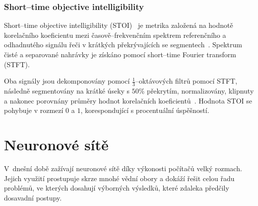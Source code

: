 



\subsection{Short--time objective intelligibility}
Short--time objective intelligibility (STOI)~\cite{taal-stoi} je metrika založená na hodnotě korelačního koeficientu mezi časově--frekvenčním spektrem referenčního a odhadnutého signálu řeči v krátkých překrývajících se segmentech~\cite{5713237}. Spektrum čisté a separované nahrávky je získáno pomocí short--time Fourier transform (STFT).

Oba signály jsou dekomponovány pomocí $\frac{1}{3}$--oktávových filtrů pomocí STFT, následně segmentovány na krátké úseky s $50\%$ překrytím, normalizovány, klipnuty a nakonec porovnány průměry hodnot korelačních koeficientů~\cite{taal-stoi}. Hodnota STOI se pohybuje v rozmezí $0$ a $1$, korespondující s procentuální úspěšností.





\chapter{Neuronové sítě}
\label{neuronovky}
V~dnešní době zažívají neuronové sítě díky výkonosti počítačů velký rozmach. Jejich využití prostupuje skrze mnohé vědní obory a dokáží řešit celou řadu problémů, ve kterých dosahují výborných výsledků, které zdaleka předčily dosavadní postupy. 


